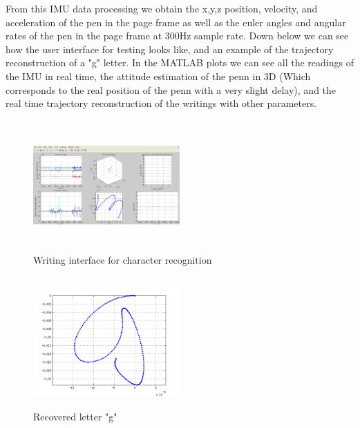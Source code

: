 \documentclass{article}
\begin{document}
From this IMU data processing we obtain the x,y,z position, velocity, and acceleration of the pen in the page frame as well as the euler angles and angular rates of the pen in the page frame at 300Hz sample rate. \newline
Down below we can see how the user interface for testing looks like, and an example of the trajectory reconstruction of a "g" letter. In the MATLAB plots we can see all the readings of the IMU in real time, the attitude estimation of the penn in 3D (Which corresponds to the real position of the penn with a very slight delay), and the real time trajectory reconstruction of the writings with other parameters.

\begin{figure}[H]
\centering
    \includegraphics[width=0.5\textwidth, height= 5cm]{interface.png}
    \caption{Writing interface for character recognition}
\end{figure}

\begin{figure}[H]
\centering
    \includegraphics[width=0.5\textwidth, height= 5cm]{g.png}
    \caption{Recovered letter "g"}
\end{figure}
\end{document}
